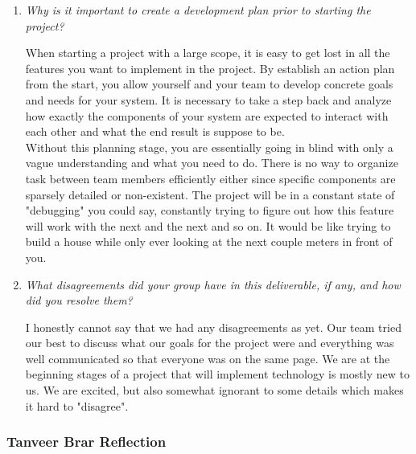 \documentclass{article}
\begin{document}
\begin{enumerate}

  \item \textit{Why is it important to create a development plan prior to starting the project?}

    When starting a project with a large scope, it is easy to get lost in all the features you want to implement in the project.
    By establish an action plan from the start, you allow yourself and your team to develop concrete goals and needs for your system.
    It is necessary to take a step back and analyze how exactly the components of your system are expected to interact with each other
    and what the end result is suppose to be.\\

    Without this planning stage, you are essentially going in blind with only a vague understanding and what you need to do. There is
    no way to organize task between team members efficiently either since specific components are sparsely detailed or non-existent. The
    project will be in a constant state of "debugging" you could say, constantly trying to figure out how this feature will work with the
    next and the next and so on. It would be like trying to build a house while only ever looking at the next couple meters in front of you.

  \item \textit{What disagreements did your group have in this deliverable, if any, and how did you resolve them?}
  
  I honestly cannot say that we had any disagreements as yet. Our team tried our best to discuss what our goals for the project were and
  everything was well communicated so that everyone was on the same page. We are at the beginning stages of a project that will implement
  technology is mostly new to us. We are excited, but also somewhat ignorant to some details which makes it hard to "disagree".

\end{enumerate}

\subsubsection*{Tanveer Brar Reflection}
\end{document}
